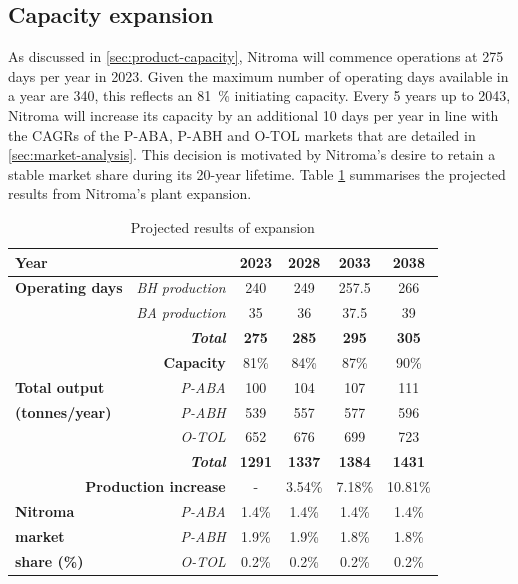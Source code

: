 \subsection{Capacity expansion}
\label{sec:expansion}
As discussed in \cref{sec:product-capacity}, Nitroma will commence operations at 275 days per year in 2023. Given the maximum number of operating days available in a year are 340, this reflects an \SI{81}{\percent} initiating capacity. Every 5 years up to 2043, Nitroma will increase its capacity by an additional 10 days per year in line with the CAGRs of the P-ABA, P-ABH and O-TOL markets that are detailed in \cref{sec:market-analysis}.  This decision is motivated by Nitroma’s desire to retain a stable market share during its 20-year lifetime. Table \ref{tab:Expansion} summarises the projected results from Nitroma’s plant expansion.

\begin{table}[h]
\centering
\caption{Projected results of expansion}
\label{tab:Expansion}
\begin{tabular}{lr|cccc}
\toprule
\multicolumn{2}{l|}{\textbf{Year}}                & \textbf{2023} & \textbf{2028} & \textbf{2033} & \textbf{2038} \\\midrule
\textbf{Operating days} & \textit{BH production}  & 240           & 249           & 257.5         & 266           \\
\textbf{}               & \textit{BA production}  & 35            & 36            & 37.5          & 39            \\
\textbf{}               & \textit{\textbf{Total}} & \textbf{275}  & \textbf{285}  & \textbf{295}  & \textbf{305}  \\
\multicolumn{2}{r|}{\textbf{Capacity}}            & 81\%          & 84\%          & 87\%          & 90\%          \\\midrule
\textbf{Total output}   & \textit{P-ABA}          & 100           & 104           & 107           & 111           \\
\textbf{(tonnes/year)}  & \textit{P-ABH} & 539  & 557  & 577           & 596           \\
\textbf{}               & \textit{O-TOL}          & 652           & 676           & 699           & 723           \\
\textbf{}               & \textit{\textbf{Total}} & \textbf{1291} & \textbf{1337} & \textbf{1384} & \textbf{1431} \\
\multicolumn{2}{r|}{\textbf{Production increase}} & -             & 3.54\%        & 7.18\%        & 10.81\%       \\\midrule
\textbf{Nitroma}        & \textit{P-ABA}          & 1.4\%         & 1.4\%         & 1.4\%         & 1.4\%         \\
\textbf{market}         & \textit{P-ABH}          & 1.9\%         & 1.9\%         & 1.8\%         & 1.8\%         \\
\textbf{share (\%)}     & \textit{O-TOL}          & 0.2\%         & 0.2\%         & 0.2\%         & 0.2\%        \\\bottomrule
\end{tabular}
\end{table}


